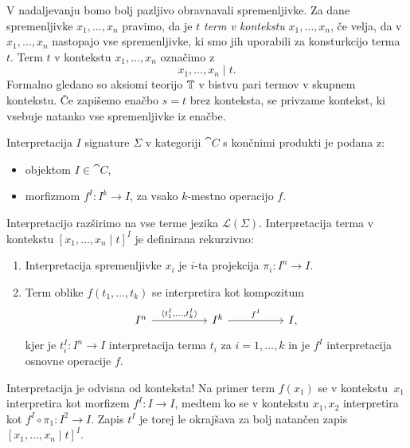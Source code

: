 \documentclass[../kategoricna_logika.tex]{subfiles}
\begin{document}
V nadaljevanju bomo bolj pazljivo obravnavali spremenljivke.
Za dane spremenljivke $x_1, \ldots, x_n$ pravimo, da je $t$ \emph{term v kontekstu} $x_1, \ldots, x_n$,
če velja, da v $x_1, \ldots, x_n$ nastopajo vse spremenljivke, ki smo jih uporabili za
konsturkcijo terma $t$. Term $t$ v kontekstu $x_1, \ldots, x_n$ označimo z
$$x_1, \ldots, x_n \mid t.$$
Formalno gledano so aksiomi teorijo $\mathbb{T}$ v bistvu pari termov v skupnem kontekstu.
Če zapišemo enačbo $s = t$ brez konteksta, se privzame kontekst, ki vsebuje natanko vse spremenljivke
iz enačbe.
\begin{definicija}
  Interpretacija $I$ signature $\Sigma$ v kategoriji $\cat{C}$ s končnimi produkti je podana z:
  \begin{itemize}
  \item objektom $I \in \cat{C}$,
  \item morfizmom $f^I : I^k \to I$, za vsako $k$-mestno operacijo $f$.
  \end{itemize}
%
  Interpretacijo razširimo na vse terme jezika $\mathcal{L}(\Sigma)$.
  Interpretacija terma v kontekstu $[x_1, \ldots, x_n \mid t]^{I}$ je definirana rekurzivno:
  \begin{enumerate}
  \item Interpretacija spremenljivke $x_i$ je $i$-ta projekcija
    $\pi_i : I^n \to I.$
%
  \item Term oblike $f(t_1, \ldots, t_k)$ se interpretira kot
    kompozitum
    \begin{equation*}
      \begin{tikzcd}[column sep = 5em]
        I^n \ar[r, "{\langle t_1^I, \ldots, t_k^I\rangle}"] & I^k \ar[r, "f^I"] & I,
      \end{tikzcd}
    \end{equation*}
    kjer je $t_i^I : I^n \to I$ interpretacija terma $t_i$ za
    $i = 1, \ldots, k$ in je $f^I$ interpretacija osnovne operacije
    $f$.
  \end{enumerate}
\end{definicija}
%
\begin{opomba}
Interpretacija je odvisna od konteksta! Na primer
  term $f(x_1)$ se v kontekstu~$x_1$ interpretira kot morfizem
  $f^I : I \to I$, medtem ko se v kontekstu $x_1, x_2$ interpretira
  kot $f^I \circ \pi_1 : I^2 \to I$. Zapis $t^I$ je
  torej le okrajšava za bolj natančen zapis
  $[x_1, \ldots, x_n \mid t]^I$.
\end{opomba}
%
\end{document}
